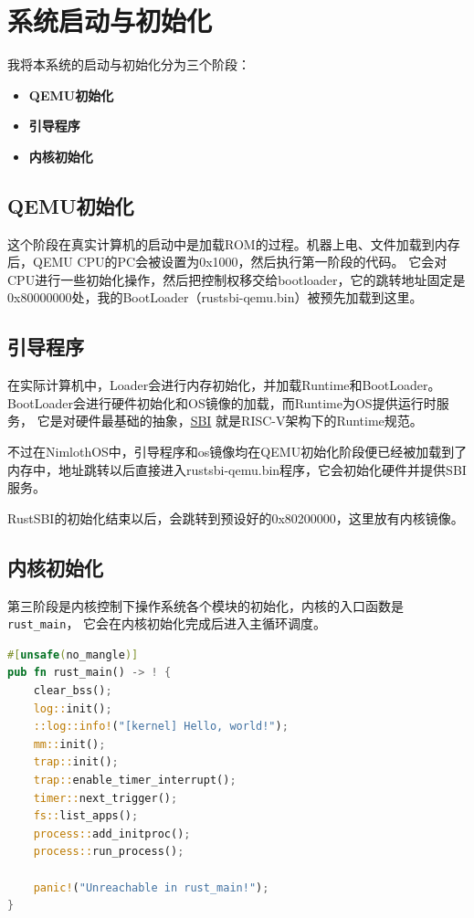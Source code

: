 \chapter{系统启动与初始化}

我将本系统的启动与初始化分为三个阶段：

\begin{itemize}
    \item \textbf{QEMU初始化}
    \item \textbf{引导程序}
    \item \textbf{内核初始化}
\end{itemize}

\section{QEMU初始化}

这个阶段在真实计算机的启动中是加载ROM的过程。机器上电、文件加载到内存后，QEMU CPU的PC会被设置为0x1000，然后执行第一阶段的代码。
它会对CPU进行一些初始化操作，然后把控制权移交给bootloader，它的跳转地址固定是0x80000000处，我的BootLoader（rustsbi-qemu.bin）被预先加载到这里。

\section{引导程序}

在实际计算机中，Loader会进行内存初始化，并加载Runtime和BootLoader。BootLoader会进行硬件初始化和OS镜像的加载，而Runtime为OS提供运行时服务，
它是对硬件最基础的抽象，\href{https://github.com/riscv-non-isa/riscv-sbi-doc}{SBI}
就是RISC-V架构下的Runtime规范。

不过在NimlothOS中，引导程序和os镜像均在QEMU初始化阶段便已经被加载到了内存中，地址跳转以后直接进入rustsbi-qemu.bin程序，它会初始化硬件并提供SBI服务。

RustSBI的初始化结束以后，会跳转到预设好的0x80200000，这里放有内核镜像。

\section{内核初始化}

第三阶段是内核控制下操作系统各个模块的初始化，内核的入口函数是\lstinline[language=Rust]{rust_main}，
它会在内核初始化完成后进入主循环调度。

\begin{lstlisting}[language=Rust,caption={内核初始化}, label={lst:kernel-init}]
#[unsafe(no_mangle)]
pub fn rust_main() -> ! {
    clear_bss();
    log::init();
    ::log::info!("[kernel] Hello, world!");
    mm::init();
    trap::init();
    trap::enable_timer_interrupt();
    timer::next_trigger();
    fs::list_apps();
    process::add_initproc();
    process::run_process();

    panic!("Unreachable in rust_main!");
}
\end{lstlisting}


